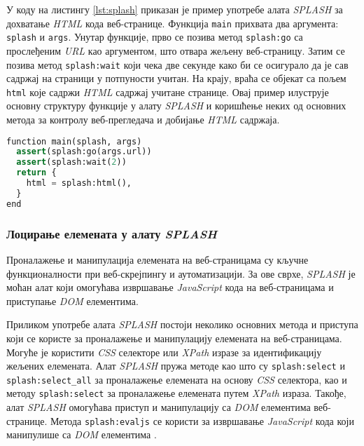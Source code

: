\documentclass[12pt,oneside]{memoir}
\begin{document}
У коду на листингу \ref{lst:splash} приказан је пример употребе алата \textit{SPLASH} за дохватање \textit{HTML} кода веб-странице. Функција \texttt{main} прихвата два аргумента: \texttt{splash} и \texttt{args}. Унутар функције, прво се позива метод \texttt{splash:go} са прослеђеним \textit{URL} као аргументом, што отвара жељену веб-страницу. Затим се позива метод \texttt{splash:wait} који чека две секунде како би се осигурало да је сав садржај на страници у потпуности учитан. На крају, враћа се објекат са пољем \texttt{html} које садржи \textit{HTML} садржај учитане странице. Овај пример илуструје основну структуру функције у алату \textit{SPLASH} и коришћење неких од основних метода за контролу веб-прегледача и добијање \textit{HTML} садржаја.
\begin{lstlisting}[language=Python, caption={Пример употребе алата \textit{SPLASH}}, label={lst:splash}]
function main(splash, args)
  assert(splash:go(args.url))
  assert(splash:wait(2))
  return {
    html = splash:html(),
  }
end
\end{lstlisting}

\subsubsection{Лоцирање елемената у алату \textit{SPLASH}}
Проналажење и манипулација елемената на веб-страницама су кључне функционалности при веб-скрејпингу и аутоматизацији. За ове сврхе, \textit{SPLASH} је моћан алат који омогућава извршавање \textit{JavaScript} кода на веб-страницама и приступање \textit{DOM} елементима.

Приликом употребе алата \textit{SPLASH} постоји неколико основних метода и приступа који се користе за проналажење и манипулацију елемената на веб-страницама. Могуће је користити \textit{CSS} селекторе или \textit{XPath} изразе за идентификацију жељених елемената. Алат \textit{SPLASH} пружа методе као што су \texttt{splash:select} и \texttt{splash:select\_all} за проналажење елемената на основу \textit{CSS} селектора, као и методу \texttt{splash:select} за проналажење елемената путем \textit{XPath} израза. Такође, алат \textit{SPLASH} омогућава приступ и манипулацију са \textit{DOM} елементима веб-странице. Метода \texttt{splash:evaljs} се користи за извршавање \textit{JavaScript} кода који манипулише са \textit{DOM} елементима \cite{splashDocs}.
\end{document}
